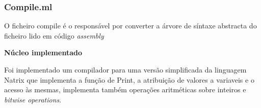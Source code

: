 \subsubsection{Compile.ml}
\label{sec2:subsubsec:compile}

O ficheiro compile é o responsável por converter a árvore de síntaxe abstracta do ficheiro lido em código \textit{assembly}

\vspace{0.5cm}

\textbf{Núcleo implementado}

\vspace{0.2cm}

Foi implementado um compilador para uma versão simplificada da linguagem Natrix que implementa a função de Print, a atribuição de valores a variaveis e o acesso às mesmas, implementa também operações aritméticas sobre inteiros e \textit{bitwise operations}.
